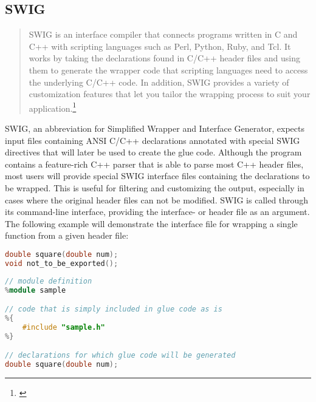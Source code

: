 
\newpage
\subsection{SWIG}

\begin{quotation}
SWIG is an interface compiler that connects programs written in C and C++ with scripting languages such as Perl, Python, Ruby, and Tcl. It works by taking the declarations found in C/C++ header files and using them to generate the wrapper code that scripting languages need to access the underlying C/C++ code. In addition, SWIG provides a variety of customization features that let you tailor the wrapping process to suit your application.\footnote{\citep{SWIGHPExec}}
\end{quotation}


SWIG, an abbreviation for Simplified Wrapper and Interface Generator, expects input files containing ANSI C/C++ declarations annotated with special SWIG directives that will later be used to create the glue code. Although the program contains a feature-rich C++ parser that is able to parse most C++ header files, most users will provide special SWIG interface files containing the declarations to be wrapped. This is useful for filtering and customizing the output, especially in cases where the original header files can not be modified. SWIG is called through its command-line interface, providing the interface- or header file as an argument.
\\The following example will demonstrate the interface file for wrapping a single function from a given header file:

\SingleSpacing
\begin{lstlisting}[language=C++, caption=Original header file: sample.h]
double square(double num);
void not_to_be_exported();
\end{lstlisting}
\OnehalfSpacing

\SingleSpacing
\begin{lstlisting}[language=C++, caption=According SWIG interface file]
// module definition
%module sample

// code that is simply included in glue code as is
%{
    #include "sample.h"
%}

// declarations for which glue code will be generated
double square(double num);
\end{lstlisting}
\OnehalfSpacing

